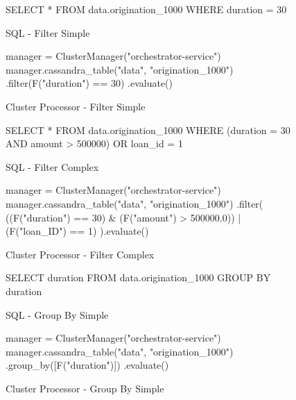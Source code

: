 \begin{figure}[htp]
	\centering
	\begin{SQL}
SELECT *
FROM data.origination_1000
WHERE duration = 30
	\end{SQL}
	\caption{SQL - Filter Simple}
	\label{fig:sql-filter-simple}
\end{figure}

\begin{figure}[htp]	
	\begin{python}
manager = ClusterManager("orchestrator-service")
manager.cassandra_table("data", "origination_1000")
.filter(F("duration") == 30)
.evaluate()
	\end{python}
	\caption{Cluster Processor - Filter Simple}
	\label{fig:cluster-filter-simple}
\end{figure}

\begin{figure}[htp]
	\centering
	\begin{SQL}
SELECT *
FROM data.origination_1000
WHERE 
(duration = 30 AND amount > 500000)
OR loan_id = 1
	\end{SQL}
	\caption{SQL - Filter Complex}
	\label{fig:sql-filter-complex}
\end{figure}
	
\begin{figure}[htp]
	\begin{python}
manager = ClusterManager("orchestrator-service")
manager.cassandra_table("data", "origination_1000")
.filter(
((F("duration") == 30) & (F("amount") > 500000.0))
| (F("loan_ID") == 1)
).evaluate()
	\end{python}
	\caption{Cluster Processor - Filter Complex}
	\label{fig:cluster-filter-complex}
\end{figure}

\begin{figure}[htp]
	\centering
	\begin{SQL}
SELECT duration
FROM data.origination_1000
GROUP BY duration
	\end{SQL}
	\caption{SQL - Group By Simple}
	\label{fig:sql-group-by-simple}
\end{figure}

\begin{figure}[htp]
	\begin{python}
manager = ClusterManager("orchestrator-service")
manager.cassandra_table("data", "origination_1000")
.group_by([F("duration")])
.evaluate()
	\end{python}
	\caption{Cluster Processor - Group By Simple}
	\label{fig:cluster-group-by-simple}
\end{figure}

